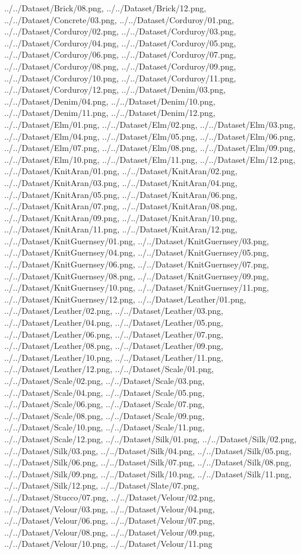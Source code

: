 \documentclass[12pt,a4paper]{article}
\begin{document}
\begin{singlespace}
{../../Dataset/Brick/08.png,
../../Dataset/Brick/12.png,
../../Dataset/Concrete/03.png,
../../Dataset/Corduroy/01.png,
../../Dataset/Corduroy/02.png,
../../Dataset/Corduroy/03.png,
../../Dataset/Corduroy/04.png,
../../Dataset/Corduroy/05.png,
../../Dataset/Corduroy/06.png,
../../Dataset/Corduroy/07.png,
../../Dataset/Corduroy/08.png,
../../Dataset/Corduroy/09.png,
../../Dataset/Corduroy/10.png,
../../Dataset/Corduroy/11.png,
../../Dataset/Corduroy/12.png,
../../Dataset/Denim/03.png,
../../Dataset/Denim/04.png,
../../Dataset/Denim/10.png,
../../Dataset/Denim/11.png,
../../Dataset/Denim/12.png,
../../Dataset/Elm/01.png,
../../Dataset/Elm/02.png,
../../Dataset/Elm/03.png,
../../Dataset/Elm/04.png,
../../Dataset/Elm/05.png,
../../Dataset/Elm/06.png,
../../Dataset/Elm/07.png,
../../Dataset/Elm/08.png,
../../Dataset/Elm/09.png,
../../Dataset/Elm/10.png,
../../Dataset/Elm/11.png,
../../Dataset/Elm/12.png,
../../Dataset/KnitAran/01.png,
../../Dataset/KnitAran/02.png,
../../Dataset/KnitAran/03.png,
../../Dataset/KnitAran/04.png,
../../Dataset/KnitAran/05.png,
../../Dataset/KnitAran/06.png,
../../Dataset/KnitAran/07.png,
../../Dataset/KnitAran/08.png,
../../Dataset/KnitAran/09.png,
../../Dataset/KnitAran/10.png,
../../Dataset/KnitAran/11.png,
../../Dataset/KnitAran/12.png,
../../Dataset/KnitGuernsey/01.png,
../../Dataset/KnitGuernsey/03.png,
../../Dataset/KnitGuernsey/04.png,
../../Dataset/KnitGuernsey/05.png,
../../Dataset/KnitGuernsey/06.png,
../../Dataset/KnitGuernsey/07.png,
../../Dataset/KnitGuernsey/08.png,
../../Dataset/KnitGuernsey/09.png,
../../Dataset/KnitGuernsey/10.png,
../../Dataset/KnitGuernsey/11.png,
../../Dataset/KnitGuernsey/12.png,
../../Dataset/Leather/01.png,
../../Dataset/Leather/02.png,
../../Dataset/Leather/03.png,
../../Dataset/Leather/04.png,
../../Dataset/Leather/05.png,
../../Dataset/Leather/06.png,
../../Dataset/Leather/07.png,
../../Dataset/Leather/08.png,
../../Dataset/Leather/09.png,
../../Dataset/Leather/10.png,
../../Dataset/Leather/11.png,
../../Dataset/Leather/12.png,
../../Dataset/Scale/01.png,
../../Dataset/Scale/02.png,
../../Dataset/Scale/03.png,
../../Dataset/Scale/04.png,
../../Dataset/Scale/05.png,
../../Dataset/Scale/06.png,
../../Dataset/Scale/07.png,
../../Dataset/Scale/08.png,
../../Dataset/Scale/09.png,
../../Dataset/Scale/10.png,
../../Dataset/Scale/11.png,
../../Dataset/Scale/12.png,
../../Dataset/Silk/01.png,
../../Dataset/Silk/02.png,
../../Dataset/Silk/03.png,
../../Dataset/Silk/04.png,
../../Dataset/Silk/05.png,
../../Dataset/Silk/06.png,
../../Dataset/Silk/07.png,
../../Dataset/Silk/08.png,
../../Dataset/Silk/09.png,
../../Dataset/Silk/10.png,
../../Dataset/Silk/11.png,
../../Dataset/Silk/12.png,
../../Dataset/Slate/07.png,
../../Dataset/Stucco/07.png,
../../Dataset/Velour/02.png,
../../Dataset/Velour/03.png,
../../Dataset/Velour/04.png,
../../Dataset/Velour/06.png,
../../Dataset/Velour/07.png,
../../Dataset/Velour/08.png,
../../Dataset/Velour/09.png,
../../Dataset/Velour/10.png,
../../Dataset/Velour/11.png}


\end{singlespace}
\end{document}
